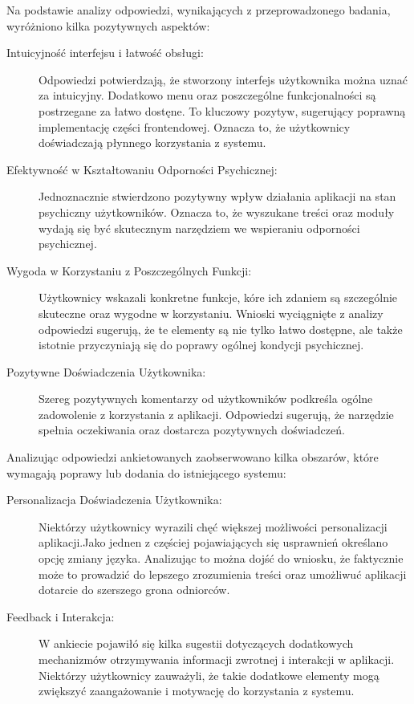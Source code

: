 Na podstawie analizy odpowiedzi, wynikających z przeprowadzonego badania, wyróżniono kilka pozytywnych aspektów:

\begin{description}
    \item[Intuicyjność interfejsu i łatwość obsługi:] Odpowiedzi potwierdzają, że stworzony interfejs użytkownika można uznać za intuicyjny. Dodatkowo menu oraz poszczególne funkcjonalności są postrzegane za łatwo dostęne. To kluczowy pozytyw, sugerujący poprawną implementację części frontendowej. Oznacza to, że użytkownicy doświadczają płynnego korzystania z systemu.
    \item[Efektywność w Kształtowaniu Odporności Psychicznej:]Jednoznacznie stwierdzono pozytywny wpływ działania aplikacji na stan psychiczny użytkowników. Oznacza to, że wyszukane treści oraz moduły wydają się być skutecznym narzędziem we wspieraniu odporności psychicznej.
    \item[Wygoda w Korzystaniu z Poszczególnych Funkcji:] Użytkownicy wskazali konkretne funkcje, kóre ich zdaniem są szczególnie skuteczne oraz wygodne w korzystaniu. Wnioski wyciągnięte z analizy odpowiedzi sugerują, że te elementy są nie tylko łatwo dostępne, ale także istotnie przyczyniają się do poprawy ogólnej kondycji psychicznej.
    \item[Pozytywne Doświadczenia Użytkownika:]
    Szereg pozytywnych komentarzy od użytkowników podkreśla ogólne zadowolenie z korzystania z aplikacji. Odpowiedzi sugerują, że narzędzie spełnia oczekiwania oraz dostarcza pozytywnych doświadczeń.
\end{description}

Analizując odpowiedzi ankietowanych zaobserwowano kilka obszarów, które wymagają poprawy lub dodania do istniejącego systemu:
\begin{description}
    \item[Personalizacja Doświadczenia Użytkownika:] Niektórzy użytkownicy wyrazili chęć większej możliwości personalizacji aplikacji.Jako jednen z częściej pojawiających się usprawnień określano opcję zmiany języka. Analizując to można dojść do wniosku, że faktycznie może to prowadzić do lepszego zrozumienia treści oraz umożliwuć aplikacji dotarcie do szerszego grona odniorców.
\item[Feedback i Interakcja:]
    W ankiecie pojawiłó się kilka sugestii dotyczących dodatkowych mechanizmów otrzymywania informacji zwrotnej i interakcji w aplikacji. Niektórzy użytkownicy zauważyli, że takie dodatkowe elementy mogą zwiększyć zaangażowanie i motywację do korzystania z systemu.
\end{description}


